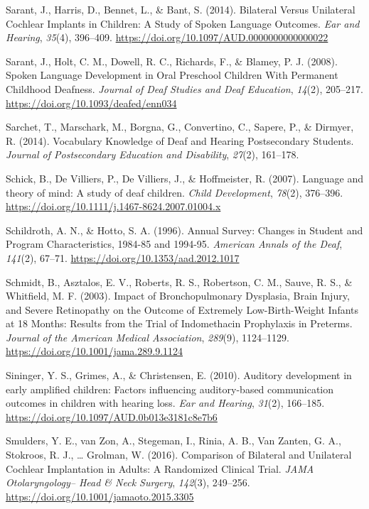 \documentclass[english,man]{apa6}
\begin{document}
\leavevmode\hypertarget{ref-sarant2014}{}%
Sarant, J., Harris, D., Bennet, L., \& Bant, S. (2014). Bilateral Versus Unilateral Cochlear Implants in Children: A Study of Spoken Language Outcomes. \emph{Ear and Hearing}, \emph{35}(4), 396--409. \url{https://doi.org/10.1097/AUD.0000000000000022}

\leavevmode\hypertarget{ref-sarant2008}{}%
Sarant, J., Holt, C. M., Dowell, R. C., Richards, F., \& Blamey, P. J. (2008). Spoken Language Development in Oral Preschool Children With Permanent Childhood Deafness. \emph{Journal of Deaf Studies and Deaf Education}, \emph{14}(2), 205--217. \url{https://doi.org/10.1093/deafed/enn034}

\leavevmode\hypertarget{ref-sarchet2014}{}%
Sarchet, T., Marschark, M., Borgna, G., Convertino, C., Sapere, P., \& Dirmyer, R. (2014). Vocabulary Knowledge of Deaf and Hearing Postsecondary Students. \emph{Journal of Postsecondary Education and Disability}, \emph{27}(2), 161--178.

\leavevmode\hypertarget{ref-schick2007}{}%
Schick, B., De Villiers, P., De Villiers, J., \& Hoffmeister, R. (2007). Language and theory of mind: A study of deaf children. \emph{Child Development}, \emph{78}(2), 376--396. \url{https://doi.org/10.1111/j.1467-8624.2007.01004.x}

\leavevmode\hypertarget{ref-schildroth1996}{}%
Schildroth, A. N., \& Hotto, S. A. (1996). Annual Survey: Changes in Student and Program Characteristics, 1984-85 and 1994-95. \emph{American Annals of the Deaf}, \emph{141}(2), 67--71. \url{https://doi.org/10.1353/aad.2012.1017}

\leavevmode\hypertarget{ref-schmidt2003}{}%
Schmidt, B., Asztalos, E. V., Roberts, R. S., Robertson, C. M., Sauve, R. S., \& Whitfield, M. F. (2003). Impact of Bronchopulmonary Dysplasia, Brain Injury, and Severe Retinopathy on the Outcome of Extremely Low-Birth-Weight Infants at 18 Months: Results from the Trial of Indomethacin Prophylaxis in Preterms. \emph{Journal of the American Medical Association}, \emph{289}(9), 1124--1129. \url{https://doi.org/10.1001/jama.289.9.1124}

\leavevmode\hypertarget{ref-sininger2010}{}%
Sininger, Y. S., Grimes, A., \& Christensen, E. (2010). Auditory development in early amplified children: Factors influencing auditory-based communication outcomes in children with hearing loss. \emph{Ear and Hearing}, \emph{31}(2), 166--185. \url{https://doi.org/10.1097/AUD.0b013e3181c8e7b6}

\leavevmode\hypertarget{ref-smulders2016}{}%
Smulders, Y. E., van Zon, A., Stegeman, I., Rinia, A. B., Van Zanten, G. A., Stokroos, R. J., \ldots{} Grolman, W. (2016). Comparison of Bilateral and Unilateral Cochlear Implantation in Adults: A Randomized Clinical Trial. \emph{JAMA Otolaryngology-- Head \& Neck Surgery}, \emph{142}(3), 249--256. \url{https://doi.org/10.1001/jamaoto.2015.3305}
\end{document}
